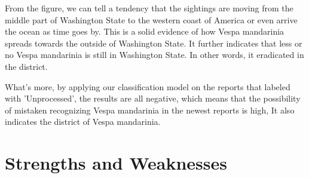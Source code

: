 \documentclass{mcmthesis}
\begin{document}
From the figure, we can tell a tendency that the sightings are moving from the middle part of Washington State to the western coast of America or even arrive the ocean as time goes by. This is a solid evidence of how Vespa mandarinia spreads towards the outside of Washington State. It further indicates that less or no Vespa mandarinia is still in Washington State. In other words, it eradicated in the district.

What's more, by applying our classification model on the reports that labeled with 'Unprocessed', the results are all negative, which means that the possibility of mistaken recognizing Vespa mandarinia in the newest reports is high, It also indicates the district of Vespa mandarinia.

\section{Strengths and Weaknesses}
\end{document}
